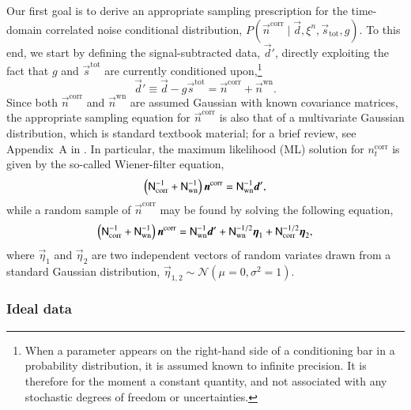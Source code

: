 \documentclass[twocolumn]{aa}
\renewcommand{\d}[0]{\vec{d}}
\newcommand{\n}[0]{\vec{n}}
\newcommand{\s}[0]{\vec{s}}
\begin{document}
Our first goal is to derive an appropriate sampling prescription for
the time-domain correlated noise conditional distribution,
${P(\vec{n}^\mathrm{corr}\mid\vec{d}, \xi^n, \vec{s}_\mathrm{tot},
  g)}$. To this end, we start by defining the signal-subtracted data,
$\vec{d}'$, directly exploiting the fact that $g$ and $\s^{\mathrm{tot}}$ are currently conditioned upon,\footnote{When a parameter appears on the right-hand side of a conditioning bar in a probability distribution, it is assumed known to infinite precision. It is therefore for the moment a constant quantity, and not associated with any stochastic degrees of freedom or uncertainties.}
\begin{equation}
 \d' \equiv \d - g \s^\mathrm{tot} = \n^\mathrm{corr} + \n^\mathrm{wn}. 
\end{equation}
Since both $\n^\mathrm{corr}$ and $\n^\mathrm{wn}$ are assumed
Gaussian with known covariance matrices, the appropriate sampling
equation for $\n^{\mathrm{corr}}$ is also that of a multivariate
Gaussian distribution, which is standard textbook material; for a
brief review, see Appendix~A in \citet{bp01}. In particular, the
maximum likelihood (ML) solution for $n_t^\mathrm{corr}$ is given by
the so-called Wiener-filter equation,
\begin{equation}\label{eq:ncorr}
 \left( \mathsf{N}_\mathrm{corr}^{-1} + \mathsf{N}_\mathrm{wn}^{-1}\right) \boldsymbol{n}^\mathrm{corr} = \mathsf{N}_\mathrm{wn}^{-1} \boldsymbol{d}', 
\end{equation}
while a random sample of $\vec{n}^\mathrm{corr}$ may be found by solving the following equation,
 \begin{equation}\label{eq:ncorr_samp}
 \left( \mathsf{N}_\mathrm{corr}^{-1} + \mathsf{N}_\mathrm{wn}^{-1}\right) \boldsymbol{n}^\mathrm{corr} = \mathsf{N}_\mathrm{wn}^{-1} \boldsymbol{d}' + \mathsf{N}_\mathrm{wn}^{-1 /2} \boldsymbol{\eta}_1 + \mathsf{N}_\mathrm{corr}^{- 1/2} \boldsymbol{\eta}_2,
 \end{equation}
where $\vec{\eta}_1$ and $\vec{\eta}_2$ are two independent vectors of
random variates drawn from a standard Gaussian distribution,
${\vec{\eta}_{1,2} \sim \mathcal{N}(\mu = 0, \sigma^2 = 1)}$.

\subsubsection{Ideal data}
\end{document}
